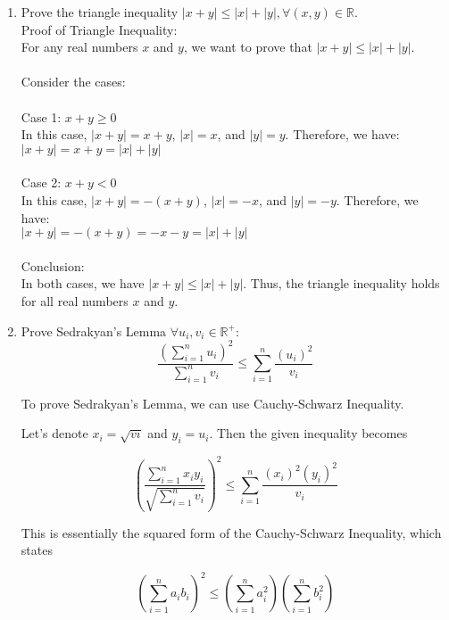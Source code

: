 \documentclass[letterpaper]{article}
\begin{document}
\begin{enumerate}
  \item Prove the triangle inequality $|x  +y| \leq |x| + |y|, \forall(x,y) \in \mathbb{R}$.\\
  Proof of Triangle Inequality:\\
    For any real numbers $x$ and $y$, we want to prove that $|x + y| \leq |x| + |y|$.\\ \\
    Consider the cases:\\ \\
    Case 1: $x + y \geq 0$\\
    In this case, $|x + y| = x + y$, $|x| = x$, and $|y| = y$. Therefore, we have:\\
    $ |x + y| = x + y = |x| + |y| $\\ \\
    Case 2: $x + y < 0$\\
    In this case, $|x + y| = -(x + y)$, $|x| = -x$, and $|y| = -y$. Therefore, we have:\\
    $ |x + y| = -(x + y) = -x - y = |x| + |y| $\\ \\
    Conclusion:\\
    In both cases, we have $|x + y| \leq |x| + |y|$. Thus, the triangle inequality holds for all real numbers $x$ and $y$.

  \item Prove Sedrakyan's Lemma $\forall u_i, v_i \in \mathbb{R}^+$:
        \setcounter{equation}{0}
        \begin{equation}
            \frac{(\sum_{i = 1}^n u_i)^2}{\sum_{i = 1}^n v_i} \leq \sum_{i=1}^n \frac{(u_i)^2}{v_i}
        \end{equation}

        To prove Sedrakyan's Lemma, we can use Cauchy-Schwarz Inequality.

        Let's denote $x_i = \sqrt{vi}$ and $y_i = u_i$. Then the given inequality becomes

        \begin{equation}
            \left(\frac{\sum_{i=1}^{n}x_iy_i}{\sqrt{\sum_{i=1}^{n}v_i}}\right)^2 \leq \sum_{i=1}^{n}\frac{(x_i)^2 (y_i)^2}{v_i}
        \end{equation}

        This is essentially the squared form of the Cauchy-Schwarz Inequality, which states

        \begin{equation}
            \left(\sum_{i=1}^{n}a_i b_i\right)^2 \leq \left(\sum_{i=1}^{n}a_i^2\right) \left(\sum_{i=1}^{n}b_i^2\right)
        \end{equation}


\end{enumerate}
\end{document}
